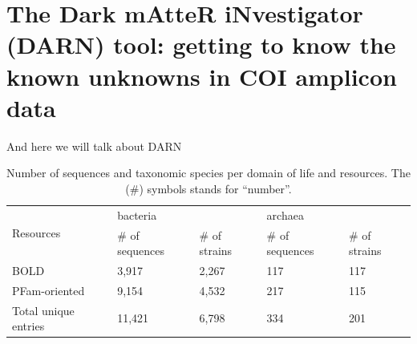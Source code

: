 \section{The Dark mAtteR iNvestigator (DARN) tool: getting to know the known unknowns in COI amplicon data}

And here we will talk about DARN


\begin{table}[]
   \begin{tabular}{lllll}
   \hline
   \multicolumn{1}{|l|}{\multirow{2}{*}{Resources}} & \multicolumn{2}{l|}{bacteria}                                             & \multicolumn{2}{l|}{archaea}                                              \\ \cline{2-5} 
   \multicolumn{1}{|l|}{}                           & \multicolumn{1}{l|}{\# of sequences} & \multicolumn{1}{l|}{\# of strains} & \multicolumn{1}{l|}{\# of sequences} & \multicolumn{1}{l|}{\# of strains} \\ \hline
   BOLD                                             & 3,917                                & 2,267                              & 117                                  & 117                                \\
   PFam-oriented                                    & 9,154                                & 4,532                              & 217                                  & 115                                \\ \hline
   \multicolumn{1}{|l|}{Total unique entries}       & \multicolumn{1}{l|}{11,421}          & \multicolumn{1}{l|}{6,798}         & \multicolumn{1}{l|}{334}             & \multicolumn{1}{l|}{201}           \\ \hline
   \end{tabular}
   \caption{Number of sequences and taxonomic species per domain of life and resources. The (\#) symbols stands for “number”.}
   \label{tab:sequences_per_domain}
\end{table}


